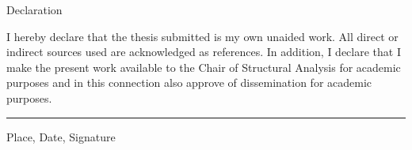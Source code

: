 \cleardoublepage
\thispagestyle{empty}

\vspace*{5cm}

\noindent Declaration

\vspace{1.5cm}

\noindent
I hereby declare that the thesis submitted is my own unaided work.
All direct or indirect sources used are acknowledged as references.
In addition, I declare that I make the present work available to the
Chair of Structural Analysis for academic purposes and in this
connection also approve of dissemination for academic purposes.

\vspace{2.5cm}

\noindent\rule{10cm}{0.4pt}

\vspace{0.3cm}

\noindent Place, Date, Signature